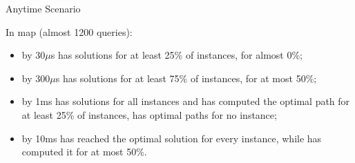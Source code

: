 \begin{frame}{Anytime Scenario}

    In  map (almost 1200 queries):

    \begin{itemize}
        \item by 30$\mu$s \anytimeCPDSearch{} has solutions for at least 25\% of instances, \AWA{} for almost 0\%;
        \item by 300$\mu$s \anytimeCPDSearch{} has solutions for at least 75\% of instances, \AWA{} for at most 50\%;
        \item by 1ms \anytimeCPDSearch{} has solutions for all instances and has computed the optimal path for at least 25\% of instances, \AWA{} has optimal paths for no instance;
        \item by 10ms \anytimeCPDSearch{} has reached the optimal solution for every instance, while \AWA{} has computed it for at most 50\%.
    \end{itemize}
\end{frame}
